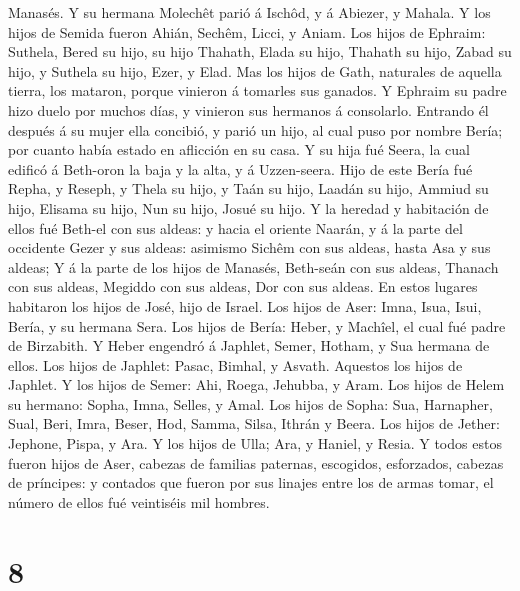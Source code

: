 Manasés.  Y su hermana Molechêt parió á Ischôd, y á
Abiezer, y Mahala.  Y los hijos de Semida fueron Ahián,
Sechêm, Licci, y Aniam.  Los hijos de Ephraim: Suthela,
Bered su hijo, su hijo Thahath, Elada su hijo, Thahath su hijo,
 Zabad su hijo, y Suthela su hijo, Ezer, y Elad. Mas los
hijos de Gath, naturales de aquella tierra, los mataron, porque vinieron
á tomarles sus ganados.  Y Ephraim su padre hizo duelo
por muchos días, y vinieron sus hermanos á consolarlo. 
Entrando él después á su mujer ella concibió, y parió un hijo, al cual
puso por nombre Bería; por cuanto había estado en aflicción en su casa.
 Y su hija fué Seera, la cual edificó á Beth-oron la baja
y la alta, y á Uzzen-seera.  Hijo de este Bería fué
Repha, y Reseph, y Thela su hijo, y Taán su hijo,  Laadán
su hijo, Ammiud su hijo, Elisama su hijo,  Nun su hijo,
Josué su hijo.  Y la heredad y habitación de ellos fué
Beth-el con sus aldeas: y hacia el oriente Naarán, y á la parte del
occidente Gezer y sus aldeas: asimismo Sichêm con sus aldeas, hasta Asa
y sus aldeas;  Y á la parte de los hijos de Manasés,
Beth-seán con sus aldeas, Thanach con sus aldeas, Megiddo con sus
aldeas, Dor con sus aldeas. En estos lugares habitaron los hijos de
José, hijo de Israel.  Los hijos de Aser: Imna, Isua,
Isui, Bería, y su hermana Sera.  Los hijos de Bería:
Heber, y Machîel, el cual fué padre de Birzabith.  Y
Heber engendró á Japhlet, Semer, Hotham, y Sua hermana de ellos.
 Los hijos de Japhlet: Pasac, Bimhal, y Asvath. Aquestos
los hijos de Japhlet.  Y los hijos de Semer: Ahi, Roega,
Jehubba, y Aram.  Los hijos de Helem su hermano: Sopha,
Imna, Selles, y Amal.  Los hijos de Sopha: Sua,
Harnapher, Sual, Beri, Imra,  Beser, Hod, Samma, Silsa,
Ithrán y Beera.  Los hijos de Jether: Jephone, Pispa, y
Ara.  Y los hijos de Ulla; Ara, y Haniel, y Resia.
 Y todos estos fueron hijos de Aser, cabezas de familias
paternas, escogidos, esforzados, cabezas de príncipes: y contados que
fueron por sus linajes entre los de armas tomar, el número de ellos fué
veintiséis mil hombres.

\hypertarget{section-7}{%
\section{8}\label{section-7}}

